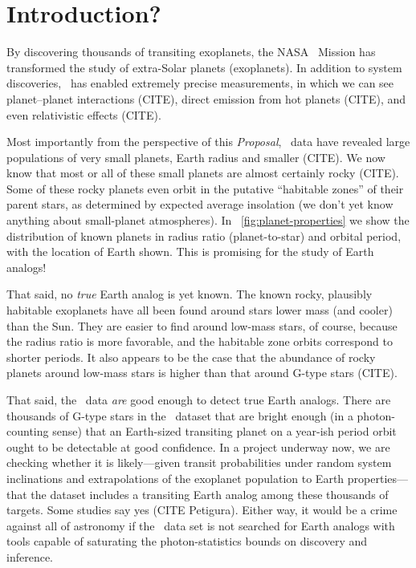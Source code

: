 \documentclass[letterpaper,12pt,preprint]{hack_aastex}
\newcommand{\documentname}{\textsl{Proposal}}
\begin{document}
\section{Introduction?}

By discovering thousands of transiting exoplanets, the NASA \Kepler\ Mission has
transformed the study of extra-Solar planets (exoplanets).
In addition to system discoveries, \Kepler\ has enabled
extremely precise measurements,
in which we can see planet--planet interactions (CITE), direct emission from
hot planets (CITE), and even relativistic effects (CITE).

Most importantly from the perspective of this \documentname,
\Kepler\ data have revealed large populations of very small planets,
Earth radius and smaller (CITE).
We now know that most or all of these small planets are almost certainly rocky
(CITE).
Some of these rocky planets even orbit in the putative ``habitable zones'' of
their parent stars, as determined by expected average insolation
(we don't yet know anything about small-planet atmospheres).
In \figurename~\ref{fig:planet-properties} we show the distribution of known
planets in radius ratio (planet-to-star) and orbital period, with the location
of Earth shown.
This is promising for the study of Earth analogs!


That said, no \emph{true} Earth analog is yet known.
The known rocky, plausibly habitable exoplanets have all been found around
stars lower mass (and cooler) than the Sun.
They are easier to find around low-mass stars, of course,
because the radius ratio is more favorable, and the habitable zone orbits
correspond to shorter periods.
It also appears to be the case that the abundance of rocky planets around
low-mass stars is higher than that around G-type stars (CITE).

That said, the \Kepler\ data \emph{are} good enough to detect true Earth
analogs.
There are thousands of G-type stars in the \Kepler\ dataset
that are bright enough (in a photon-counting sense) that an Earth-sized
transiting planet on a year-ish period orbit ought to be detectable at good
confidence.
In a project underway now, we are checking whether it is likely---given transit
probabilities under random system inclinations and extrapolations of the
exoplanet population to Earth properties---that the dataset includes a
transiting Earth analog among these thousands of targets.
Some studies say yes (CITE Petigura).
Either way, it would be a crime against all of astronomy if the \Kepler\ data
set is not searched for Earth analogs with tools capable of saturating the
photon-statistics bounds on discovery and inference.
\end{document}
